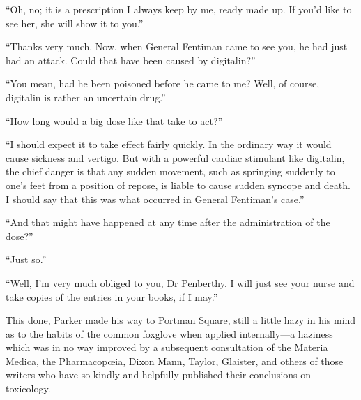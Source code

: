 \enquote{Oh, no; it is a prescription I always keep by me, ready made up. If you'd like to see her, she will show it to you.}

\enquote{Thanks very much. Now, when General Fentiman came to see you, he had just had an attack. Could that have been caused by digitalin?}

\enquote{You mean, had he been poisoned before he came to me? Well, of course, digitalin is rather an uncertain drug.}

\enquote{How long would a big dose like that take to act?}

\enquote{I should expect it to take effect fairly quickly. In the ordinary way it would cause sickness and vertigo. But with a powerful cardiac stimulant like digitalin, the chief danger is that any sudden movement, such as springing suddenly to one's feet from a position of repose, is liable to cause sudden syncope and death. I should say that this was what occurred in General Fentiman's case.}

\enquote{And that might have happened at any time after the administration of the dose?}

\enquote{Just so.}

\enquote{Well, I'm very much obliged to you, Dr Penberthy. I will just see your nurse and take copies of the entries in your books, if I may.}

This done, Parker made his way to Portman Square, still a little hazy in his mind as to the habits of the common foxglove when applied internally\allowbreak---\allowbreak a haziness which was in no way improved by a subsequent consultation of the Materia Medica, the Pharmacopœia, Dixon Mann, Taylor, Glaister, and others of those writers who have so kindly and helpfully published their conclusions on toxicology.
